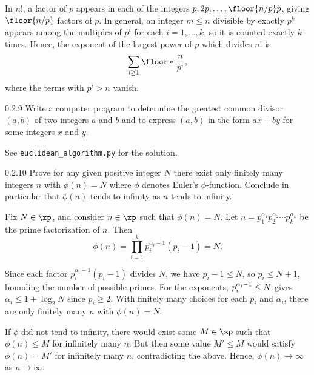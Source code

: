 \begin{sol}
    In $n!$, a factor of $p$ appears in each of the integers $p, 2p, \ldots, \floor{n/p}p$, giving $\floor{n/p}$ factors of $p$.
    In general, an integer $m \leq n$ divisible by exactly $p^k$ appears among the multiples of $p^i$ for each $i = 1, \ldots, k$, so it is counted exactly $k$ times.
    Hence, the exponent of the largest power of $p$ which divides $n!$ is
    \[
        \sum_{i \geq 1} \floor*{\frac{n}{p^i}},
    \]
    where the terms with $p^i > n$ vanish.
\end{sol}

\begin{exercise}{0.2.9}
    Write a computer program to determine the greatest common divisor $(a, b)$ of two integers $a$ and $b$ and to express $(a, b)$ in the form $ax + by$ for some integers $x$ and $y$.
\end{exercise}

\begin{sol}
    See \verb|euclidean_algorithm.py| for the solution.
\end{sol}

\begin{exercise}{0.2.10}
    Prove for any given positive integer $N$ there exist only finitely many integers $n$ with $\phi(n) = N$ where $\phi$ denotes Euler's $\phi$-function.
	Conclude in particular that $\phi(n)$ tends to infinity as $n$ tends to infinity.
\end{exercise}

\begin{sol}
    Fix $N \in \zp$, and consider $n \in \zp$ such that $\phi(n) = N$.
	Let $n = p_1^{\alpha_1} p_2^{\alpha_2} \cdots p_k^{\alpha_k}$ be the prime factorization of $n$.
	Then
    \[
    	\phi(n) = \prod_{i=1}^k p_i^{\alpha_i - 1}(p_i - 1) = N.
    \]
    
    Since each factor $p_i^{\alpha_i - 1}(p_i - 1)$ divides $N$, we have $p_i - 1 \leq N$, so $p_i \leq N + 1$, bounding the number of possible primes.
	For the exponents, $\smash{p_i^{\alpha_i - 1}} \leq N$ gives $\alpha_i \leq 1 + \log_2 N$ since $p_i \geq 2$.
	With finitely many choices for each $p_i$ and $\alpha_i$, there are only finitely many $n$ with $\phi(n) = N$.

    If $\phi$ did not tend to infinity, there would exist some $M \in \zp$ such that $\phi(n) \leq M$ for infinitely many $n$.
	But then some value $M' \leq M$ would satisfy $\phi(n) = M'$ for infinitely many $n$, contradicting the above.
	Hence, $\phi(n) \to \infty$ as $n \to \infty$.
\end{sol}

